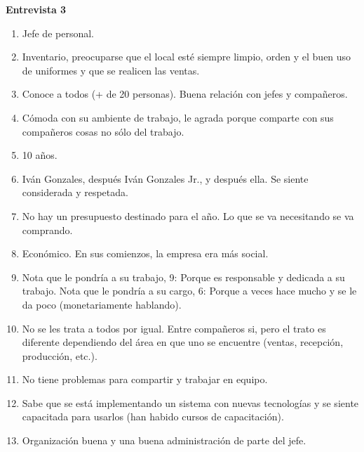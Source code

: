 \newpage
\textbf{Entrevista 3}\\
\begin{enumerate}
	\item Jefe de personal.
	\item Inventario, preocuparse que el local esté siempre limpio, orden y el buen uso de uniformes y que se realicen las ventas.
	\item Conoce a todos (+ de 20 personas). Buena relación con jefes y compañeros.
	\item Cómoda con su ambiente de trabajo, le agrada porque comparte con sus compañeros cosas no sólo del trabajo.
	\item 10 años.
	\item Iván Gonzales, después Iván Gonzales Jr., y después ella. Se siente considerada y respetada.
	\item No hay un presupuesto destinado para el año. Lo que se va necesitando se va comprando.
	\item Económico. En sus comienzos, la empresa era más social.
	\item Nota que le pondría a su trabajo, 9: Porque es responsable y dedicada a su trabajo. Nota que le pondría a su cargo, 6: Porque a veces hace mucho y se le da poco (monetariamente hablando).
	\item No se les trata a todos por igual. Entre compañeros si, pero el trato es diferente dependiendo del área en que uno se encuentre (ventas, recepción, producción, etc.).
	\item No tiene problemas para compartir y trabajar en equipo.
	\item Sabe que se está implementando un sistema con nuevas tecnologías y se siente capacitada para usarlos (han habido cursos de capacitación).
	\item Organización buena y una buena administración de parte del jefe.
\end{enumerate}

